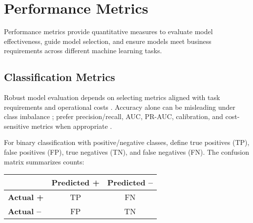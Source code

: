 
\section{Performance Metrics }
\label{sec:performance-metrics}

Performance metrics provide quantitative measures to evaluate model effectiveness, guide model selection, and ensure models meet business requirements across different machine learning tasks.

\subsection{Classification Metrics}

Robust model evaluation depends on selecting metrics aligned with task requirements and operational costs . Accuracy alone can be misleading under class imbalance ; prefer precision/recall, AUC, PR-AUC, calibration, and cost-sensitive metrics when appropriate \textcite{GoodfellowEtAl2016,Prince2023}.

\begin{definition}
For binary classification with positive/negative classes, define true positives (TP), false positives (FP), true negatives (TN), and false negatives (FN). The confusion matrix  summarizes counts:

\begin{center}
\begin{tabular}{@{}lcc@{}}\toprule
 & \textbf{Predicted +} & \textbf{Predicted --} \\
\midrule
\textbf{Actual +} & TP & FN \\
\textbf{Actual --} & FP & TN \\
\bottomrule
\end{tabular}
\end{center}
\end{definition}


